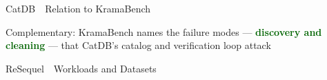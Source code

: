 \documentclass[aspectratio=169]{beamer}
\newcommand{\hgreen}[1]{\textcolor{darkgreen}{\textbf{#1}}}
\newcommand{\apptitle}[3]{%
  \textcolor{#1}{#2}~\textcolor{black!30}{\textbar}~#3}
\begin{document}
{\begin{frame}{\apptitle{tugb}{CatDB}{Relation to KramaBench}}
\vspace{2mm}
\begin{exampleblock}{}
  \centering\scriptsize
  Complementary: KramaBench names the failure modes --- \hgreen{discovery and
  cleaning} --- that CatDB's catalog and verification loop attack
\end{exampleblock}
\end{frame}




\begin{frame}{\apptitle{tug}{ReSequel}{Workloads and Datasets}}
\vspace{1mm}
\begin{columns}[T]


\end{columns}
\end{frame}}
\end{document}
